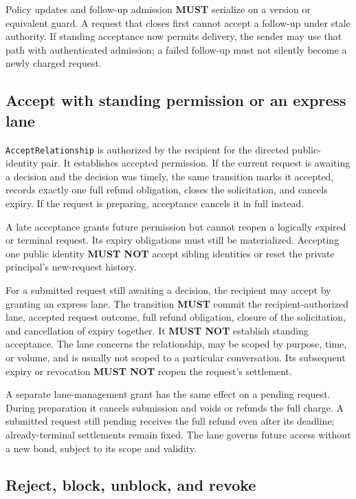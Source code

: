 \documentclass[11pt]{article}
\newcommand{\MUST}{\textbf{MUST}}
\newcommand{\MUSTNOT}{\textbf{MUST NOT}}
\begin{document}
Policy updates and follow-up admission \MUST{} serialize on a version or
equivalent guard. A request that closes first cannot accept a follow-up under
stale authority. If standing acceptance now permits delivery, the sender may use
that path with authenticated admission; a failed follow-up must not silently
become a newly charged request.

\subsection{Accept with standing permission or an express lane}

\texttt{AcceptRelationship} is authorized by the recipient for the directed
public-identity pair. It establishes accepted permission. If the current request
is awaiting a decision and the decision was timely, the same transition marks it accepted,
records exactly one full refund obligation, closes the solicitation, and cancels
expiry. If the request is preparing, acceptance cancels it in full instead.

A late acceptance grants future permission but cannot reopen a logically expired
or terminal request. Its expiry obligations must still be materialized. Accepting
one public identity \MUSTNOT{} accept sibling identities or reset the private
principal's new-request history.

For a submitted request still awaiting a decision, the recipient may accept by
granting an express lane. The transition \MUST{} commit the recipient-authorized
lane, accepted request outcome, full refund obligation, closure of the
solicitation, and cancellation of expiry together. It \MUSTNOT{} establish
standing acceptance. The lane concerns the relationship, may be scoped by purpose,
time, or volume, and is usually not scoped to a particular conversation.
Its subsequent expiry or revocation \MUSTNOT{} reopen the request's settlement.

A separate lane-management grant has the same effect on a pending request.
During preparation it cancels submission and voids or refunds the full charge.
A submitted request still pending receives the full refund even after its deadline;
already-terminal settlements remain fixed. The lane governs future access without
a new bond, subject to its scope and validity.

\subsection{Reject, block, unblock, and revoke}
\end{document}
